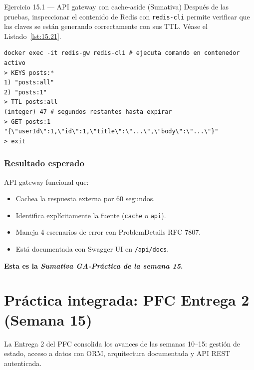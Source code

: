 \begin{cajaejercicio}{Ejercicio 15.1 --- API gateway con cache-aside (Sumativa)}
Después de las pruebas, inspeccionar el contenido de Redis
con \texttt{redis-cli} permite verificar que las claves se están
generando correctamente con sus TTL. V\'ease el Listado~\ref{lst:15.21}.


\begin{lstlisting}[style=shell,numbers=none,caption={Ejemplo de Shell},label=lst:15.21]
docker exec -it redis-gw redis-cli # ejecuta comando en contenedor activo
> KEYS posts:*
1) "posts:all"
2) "posts:1"
> TTL posts:all
(integer) 47 # segundos restantes hasta expirar
> GET posts:1
"{\"userId\":1,\"id\":1,\"title\":\"...\",\"body\":\"...\"}"
> exit
\end{lstlisting}

\subsubsection*{Resultado esperado}

API gateway funcional que:
\begin{itemize}
\item Cachea la respuesta externa por 60 segundos.
\item Identifica explícitamente la fuente (\texttt{cache} o
\texttt{api}).
\item Maneja 4 escenarios de error con ProblemDetails RFC 7807.
\item Está documentada con Swagger UI en \texttt{/api/docs}.
\end{itemize}

\textbf{Esta es la \emph{Sumativa GA-Práctica de la semana 15}.}
\end{cajaejercicio}

\section{Práctica integrada: PFC Entrega 2 (Semana 15)}

La Entrega 2 del PFC consolida los avances de las semanas
10--15: gestión de estado, acceso a datos con ORM, arquitectura
documentada y API REST autenticada.


